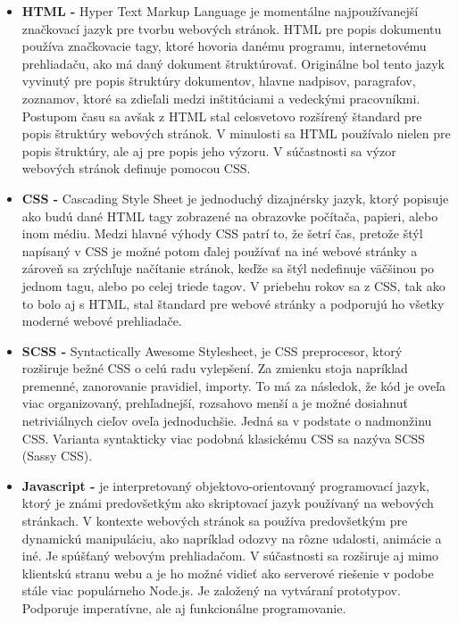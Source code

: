 \begin{itemize}
    \item \textbf{HTML -} Hyper Text Markup Language je momentálne najpoužívanejší značkovací jazyk pre tvorbu webových stránok. HTML pre popis dokumentu používa značkovacie tagy, ktoré hovoria danému programu, internetovému prehliadaču, ako má daný dokument štruktúrovať. Originálne bol tento jazyk vyvinutý pre popis štruktúry dokumentov, hlavne nadpisov, paragrafov, zoznamov, ktoré sa zdieľali medzi inštitúciami a vedeckými pracovníkmi. Postupom času sa avšak z HTML stal celosvetovo rozšírený štandard pre popis štruktúry webových stránok. V minulosti sa HTML používalo nielen pre popis štruktúry, ale aj pre popis jeho výzoru. V súčastnosti sa výzor webových stránok definuje pomocou CSS. \cite{fswG1WVQQnoCa64c}
    \item \textbf{CSS -} Cascading Style Sheet je jednoduchý dizajnérsky jazyk, ktorý popisuje ako budú dané HTML tagy zobrazené na obrazovke počítača, papieri, alebo inom médiu. Medzi hlavné výhody CSS patrí to, že šetrí čas, pretože štýl napísaný v CSS je možné potom ďalej používať na iné webové stránky a zároveň sa zrýchľuje načítanie stránok, keďže sa štýl nedefinuje väčšinou po jednom tagu, alebo po celej triede tagov. V priebehu rokov sa z CSS, tak ako to bolo aj s HTML, stal štandard pre webové stránky a podporujú ho všetky moderné webové prehliadače. \cite{VNZJ2nmvOm16rWtR}
    \item \textbf{SCSS -} Syntactically Awesome Stylesheet, je CSS preprocesor, ktorý rozširuje bežné CSS o celú radu vylepšení. Za zmienku stoja napríklad premenné, zanorovanie pravidiel, importy. To má za následok, že kód je oveľa viac organizovaný, prehľadnejší, rozsahovo menší a je možné dosiahnuť netriviálnych cieľov oveľa jednoduchšie. Jedná sa v podstate o nadmonžinu CSS. Varianta syntakticky viac podobná klasickému CSS sa nazýva SCSS (Sassy CSS). \cite{SIWRi1jHe5vClhda}
    \item \textbf{Javascript -} je interpretovaný objektovo-orientovaný programovací jazyk, ktorý je známi predovšetkým ako skriptovací jazyk používaný na webových stránkach. V kontexte webových stránok sa používa predovšetkým pre dynamickú manipuláciu, ako napríklad odozvy na rôzne udalosti, animácie a iné. Je spúšťaný webovým prehliadačom. V súčastnosti sa rozširuje aj mimo klientskú stranu webu a je ho možné vidieť ako serverové riešenie v podobe stále viac populárneho Node.js. Je založený na vytváraní prototypov. Podporuje imperatívne, ale aj funkcionálne programovanie. \cite{mpahm68E0P8GyL7C}

\end{itemize}
